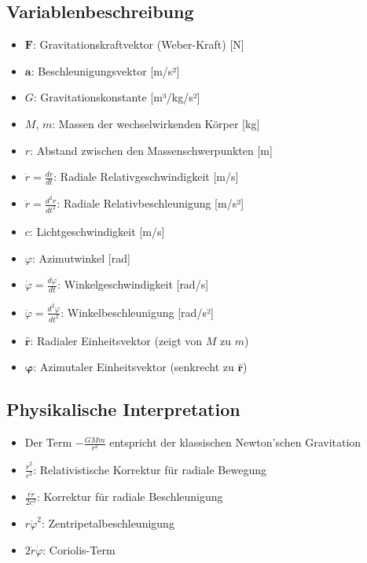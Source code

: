 \subsection*{Variablenbeschreibung}
\begin{itemize}[leftmargin=*,noitemsep]
    \item $\mathbf{F}$: Gravitationskraftvektor (Weber-Kraft) [N]
    \item $\mathbf{a}$: Beschleunigungsvektor [m/s²]
    \item $G$: Gravitationskonstante [m³/kg/s²]
    \item $M$, $m$: Massen der wechselwirkenden Körper [kg]
    \item $r$: Abstand zwischen den Massenschwerpunkten [m]
    \item $\dot{r} = \frac{dr}{dt}$: Radiale Relativgeschwindigkeit [m/s]
    \item $\ddot{r} = \frac{d^2r}{dt^2}$: Radiale Relativbeschleunigung [m/s²]
    \item $c$: Lichtgeschwindigkeit [m/s]
    \item $\varphi$: Azimutwinkel [rad]
    \item $\dot{\varphi} = \frac{d\varphi}{dt}$: Winkelgeschwindigkeit [rad/s]
    \item $\ddot{\varphi} = \frac{d^2\varphi}{dt^2}$: Winkelbeschleunigung [rad/s²]
    \item $\mathbf{\hat{r}}$: Radialer Einheitsvektor (zeigt von $M$ zu $m$)
    \item $\mathbf{\hat{\varphi}}$: Azimutaler Einheitsvektor (senkrecht zu $\mathbf{\hat{r}}$)
\end{itemize}

\subsection*{Physikalische Interpretation}
\begin{itemize}[leftmargin=*,noitemsep]
    \item Der Term $-\frac{GMm}{r^2}$ entspricht der klassischen Newton'schen Gravitation
    \item $\frac{\dot{r}^2}{c^2}$: Relativistische Korrektur für radiale Bewegung
    \item $\frac{r\ddot{r}}{2c^2}$: Korrektur für radiale Beschleunigung
    \item $r\dot{\varphi}^2$: Zentripetalbeschleunigung
    \item $2\dot{r}\dot{\varphi}$: Coriolis-Term
\end{itemize}

